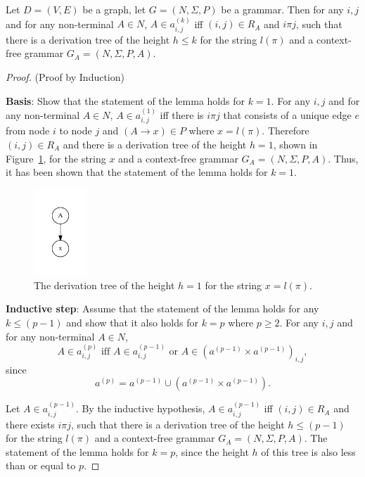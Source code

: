 \documentclass[runningheads,a4paper]{llncs}
\begin{document}
\begin{lemma}\label{lemma:cf}
	Let $D = (V,E)$ be a graph, let $G =(N,\Sigma,P)$ be a grammar. Then for any $i, j$ and for any non-terminal $A \in N$, $A \in a^{(k)}_{i,j}$ iff $(i,j) \in R_A$ and $i \pi j$, such that there is a derivation tree of the height $h \leq k$ for the string $l(\pi)$ and a context-free grammar $G_A = (N,\Sigma,P,A)$.
\end{lemma}
\begin{proof}(Proof by Induction)
	
	\textbf{Basis}: Show that the statement of the lemma holds for $k = 1$. For any $i, j$ and for any non-terminal $A \in N$, $A \in a^{(1)}_{i,j}$ iff there is $i \pi j$ that consists of a unique edge $e$ from node $i$ to node $j$ and $(A \rightarrow x) \in P$ where $x = l(\pi)$. Therefore $(i,j) \in R_A$ and there is a derivation tree of the height $h = 1$, shown in Figure~\ref{tree1}, for the string $x$ and a context-free grammar $G_A = (N,\Sigma,P,A)$. Thus, it has been shown that the statement of the lemma holds for $k = 1$.
	
	\begin{figure}[h!]
		\centering
		\includegraphics[width=2cm]{pictures/tree1.pdf}
		\caption{The derivation tree of the height $h = 1$ for the string $x = l(\pi)$.}
		\label{tree1}
	\end{figure}
	
	\textbf{Inductive step}: Assume that the statement of the lemma holds for any $k \leq (p - 1)$ and show that it also holds for $k = p$ where $p \geq 2$. For any $i, j$ and for any non-terminal $A \in N$, $$A \in a^{(p)}_{i,j} \text{ iff } A \in a^{(p-1)}_{i,j} \text{ or } A \in (a^{(p-1)} \times a^{(p-1)})_{i,j},$$ since $$a^{(p)} = a^{(p-1)} \cup (a^{(p-1)} \times a^{(p-1)}).$$
	
	Let $A \in a^{(p-1)}_{i,j}$. By the inductive hypothesis, $A \in a^{(p-1)}_{i,j}$ iff $(i,j) \in R_A$ and there exists $i \pi j$, such that there is a derivation tree of the height $h \leq (p-1)$ for the string $l(\pi)$ and a context-free grammar $G_A = (N,\Sigma,P,A)$. The statement of the lemma holds for $k = p$, since the height $h$ of this tree is also less than or equal to $p$.
	

\end{proof}
\end{document}
